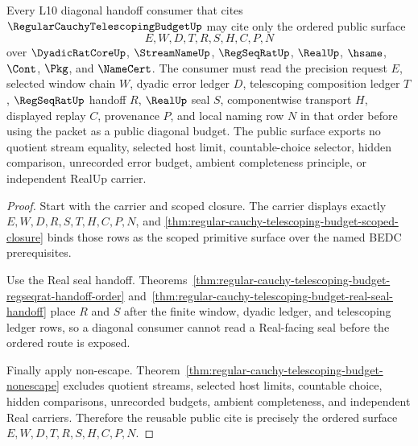 \begin{theorem}
\label{thm:regular-cauchy-telescoping-budget-public-export}
Every L10 diagonal handoff consumer that cites $\RegularCauchyTelescopingBudgetUp$ may cite only the ordered public surface
$$
E,W,D,T,R,S,H,C,P,N
$$
over $\DyadicRatCoreUp$, $\StreamNameUp$, $\RegSeqRatUp$, $\RealUp$, $\hsame$, $\Cont$, $\Pkg$, and $\NameCert$. The consumer must read the precision request $E$, selected window chain $W$, dyadic error ledger $D$, telescoping composition ledger $T$, $\RegSeqRatUp$ handoff $R$, $\RealUp$ seal $S$, componentwise transport $H$, displayed replay $C$, provenance $P$, and local naming row $N$ in that order before using the packet as a public diagonal budget. The public surface exports no quotient stream equality, selected host limit, countable-choice selector, hidden comparison, unrecorded error budget, ambient completeness principle, or independent RealUp carrier.
\end{theorem}
\begin{proof}
Start with the carrier and scoped closure. The carrier displays exactly $E,W,D,R,S,T,H,C,P,N$, and \autoref{thm:regular-cauchy-telescoping-budget-scoped-closure} binds those rows as the scoped primitive surface over the named BEDC prerequisites.

Use the Real seal handoff. Theorems~\ref{thm:regular-cauchy-telescoping-budget-regseqrat-handoff-order} and~\ref{thm:regular-cauchy-telescoping-budget-real-seal-handoff} place $R$ and $S$ after the finite window, dyadic ledger, and telescoping ledger rows, so a diagonal consumer cannot read a Real-facing seal before the ordered route is exposed.

Finally apply non-escape. Theorem~\ref{thm:regular-cauchy-telescoping-budget-nonescape} excludes quotient streams, selected host limits, countable choice, hidden comparisons, unrecorded budgets, ambient completeness, and independent Real carriers. Therefore the reusable public cite is precisely the ordered surface $E,W,D,T,R,S,H,C,P,N$.
\end{proof}

